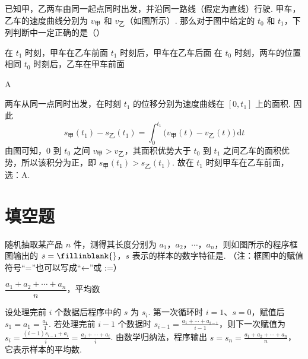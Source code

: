 \begin{problem}
已知甲，乙两车由同一起点同时出发，并沿同一路线（假定为直线）行驶. 甲车，乙车的速度曲线分别为 \(v_{\text{甲}}\) 和 \(v_{\text{乙}}\)（如图所示）. 那么对于图中给定的 \(t_0\) 和 \(t_1\)，下列判断中一定正确的是（\quad）


\choices
    {在 \(t_1\) 时刻，甲车在乙车前面}
    {\(t_1\) 时刻后，甲车在乙车后面}
    {在 \(t_0\) 时刻，两车的位置相同}
    {\(t_0\) 时刻后，乙车在甲车前面}
\end{problem}

\begin{answer}
A
\end{answer}

\begin{solution}
两车从同一点同时出发，在时刻 \(t_1\) 的位移分别为速度曲线在 \([0,t_1]\) 上的面积. 因此
\[
s_{\text{甲}}(t_1)-s_{\text{乙}}(t_1)=\int_0^{t_1}\bigl(v_{\text{甲}}(t)-v_{\text{乙}}(t)\bigr)\,\mathrm{d}t
\]
由图可知，\(0\) 到 \(t_0\) 之间 \(v_{\text{甲}}>v_{\text{乙}}\)，其面积优势大于 \(t_0\) 到 \(t_1\) 之间乙车的面积优势，所以该积分为正，即 \(s_{\text{甲}}(t_1)>s_{\text{乙}}(t_1)\). 故在 \(t_1\) 时刻甲车在乙车前面，选：A.
\end{solution}

\section{填空题}

\begin{problem}
随机抽取某产品 \(n\) 件，测得其长度分别为 \(a_1\)，\(a_2\)，\(\cdots\)，\(a_n\)，则如图所示的程序框图输出的 \(s =\fillinblank{}\)，\(s\) 表示的样本的数字特征是\fillinblank{}. （注：框图中的赋值符号“=”也可以写成“←”或 \(\text{:=}\)）

\end{problem}

\begin{answer}
\(\dfrac{a_1+a_2+\cdots+a_n}{n}\)，平均数
\end{answer}

\begin{solution}
设处理完前 \(i\) 个数据后程序中的 \(s\) 为 \(s_i\). 第一次循环时 \(i=1\)、\(s=0\)，赋值后 \(s_1=a_1=\frac{a_1}{1}\). 若处理完前 \(i-1\) 个数据时 \(s_{i-1}=\frac{a_1+\cdots+a_{i-1}}{i-1}\)，则下一次赋值为 \(s_i=\frac{(i-1)s_{i-1}+a_i}{i}=\frac{a_1+\cdots+a_i}{i}\). 由数学归纳法，程序输出 \(s=s_n=\frac{a_1+a_2+\cdots+a_n}{n}\)，它表示样本的平均数.
\end{solution}

